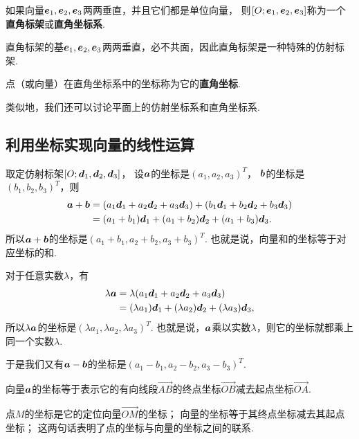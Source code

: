 \begin{definition}
如果向量\(\boldsymbol{e}_1,\boldsymbol{e}_2,\boldsymbol{e}_3\)两两垂直，并且它们都是单位向量，
则\([O;\boldsymbol{e}_1,\boldsymbol{e}_2,\boldsymbol{e}_3]\)称为一个\textbf{直角标架}或\textbf{直角坐标系}.
\end{definition}

直角标架的基\(\boldsymbol{e}_1,\boldsymbol{e}_2,\boldsymbol{e}_3\)两两垂直，必不共面，因此直角标架是一种特殊的仿射标架.

点（或向量）在直角坐标系中的坐标称为它的\textbf{直角坐标}.

类似地，我们还可以讨论平面上的仿射坐标系和直角坐标系.

\subsection{利用坐标实现向量的线性运算}
取定仿射标架\([O;\boldsymbol{d}_1,\boldsymbol{d}_2,\boldsymbol{d}_3]\)，
设\(\boldsymbol{a}\)的坐标是\((a_1,a_2,a_3)^T\)，
\(\boldsymbol{b}\)的坐标是\((b_1,b_2,b_3)^T\)，则\begin{align*}
\boldsymbol{a}+\boldsymbol{b}
&= (a_1 \boldsymbol{d}_1 + a_2 \boldsymbol{d}_2 + a_3 \boldsymbol{d}_3)
+ (b_1 \boldsymbol{d}_1 + b_2 \boldsymbol{d}_2 + b_3 \boldsymbol{d}_3) \\
&= (a_1 + b_1) \boldsymbol{d}_1 + (a_1 + b_2) \boldsymbol{d}_2 + (a_1 + b_3) \boldsymbol{d}_3.
\end{align*}
所以\(\boldsymbol{a}+\boldsymbol{b}\)的坐标是\((a_1+b_1,a_2+b_2,a_3+b_3)^T\).
也就是说，向量和的坐标等于对应坐标的和.

对于任意实数\(\lambda\)，有\begin{align*}
\lambda \boldsymbol{a}
&= \lambda (a_1 \boldsymbol{d}_1 + a_2 \boldsymbol{d}_2 + a_3 \boldsymbol{d}_3) \\
&= (\lambda a_1) \boldsymbol{d}_1 + (\lambda a_2) \boldsymbol{d}_2 + (\lambda a_3) \boldsymbol{d}_3,
\end{align*}
所以\(\lambda \boldsymbol{a}\)的坐标是\((\lambda a_1,\lambda a_2,\lambda a_3)^T\).
也就是说，\(\boldsymbol{a}\)乘以实数\(\lambda\)，则它的坐标就都乘上同一个实数\(\lambda\).

于是我们又有\(\boldsymbol{a}-\boldsymbol{b}\)的坐标是\((a_1-b_1,a_2-b_2,a_3-b_3)^T\).

\begin{theorem}
向量\(\boldsymbol{a}\)的坐标等于表示它的有向线段\(\vec{AB}\)的终点坐标\(\vec{OB}\)减去起点坐标\(\vec{OA}\).
\end{theorem}

点\(M\)的坐标是它的定位向量\(\vec{OM}\)的坐标；
向量的坐标等于其终点坐标减去其起点坐标；
这两句话表明了点的坐标与向量的坐标之间的联系.

